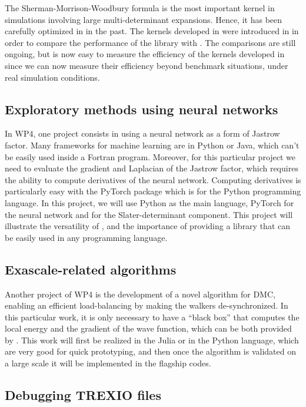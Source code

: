 The Sherman-Morrison-Woodbury formula is the most important kernel in
simulations involving large multi-determinant expansions. Hence, it has
been carefully optimized in \qmcchem{} in the past. The kernels
developed in \QMCkl{} were introduced in \qmcchem{} in order
to compare the performance of the library with \qmcchem{}. The
comparisons are still ongoing, but is now easy to measure the
efficiency of the kernels developed in \QMCkl{} since we can now
measure their efficiency beyond benchmark situations, under real
simulation conditions.

\subsection{Exploratory methods using neural networks}

In \ac{WP}4, one project consists in using a neural network as a
form of Jastrow factor. Many frameworks for machine learning are in
Python or Java, which can't be easily used inside a Fortran program.
Moreover, for this particular project we need to evaluate the gradient
and Laplacian of the Jastrow factor, which requires the ability to
compute derivatives of the neural network. Computing derivatives is
particularly easy with the PyTorch package which is for the Python
programming language. In this project, we will use Python as the main
language, PyTorch for the neural network and \QMCkl for the
Slater-determinant component. This project will illustrate the
versatility of \QMCkl, and the importance of providing a library that
can be easily used in any programming language.


\subsection{Exascale-related algorithms}

Another project of \ac{WP}4 is the development of a novel algorithm
for \ac{DMC}, enabling an efficient load-balancing by
making the walkers de-synchronized. In this particular work, it is only
necessary to have a ``black box'' that computes the local energy and
the gradient of the wave function, which can be both provided by \QMCkl{}.
This work will first be realized in the Julia or in the Python
language, which are very good for quick prototyping, and then once the
algorithm is validated on a large scale it will be implemented in the
flagship codes.


\subsection{Debugging TREXIO files}

